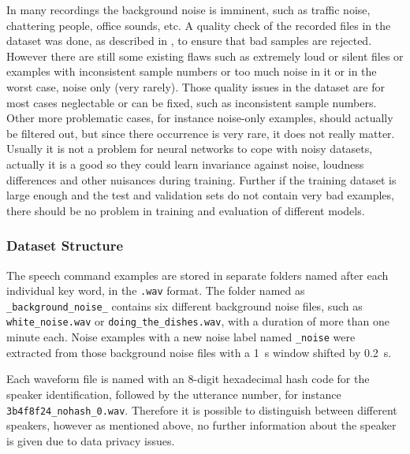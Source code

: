 In many recordings the background noise is imminent, such as traffic noise, chattering people, office sounds, etc.
A quality check of the recorded files in the dataset was done, as described in \cite{Warden2018}, to ensure that bad samples are rejected.
However there are still some existing flaws such as extremely loud or silent files or examples with inconsistent sample numbers or too much noise in it or in the worst case, noise only (very rarely).
Those quality issues in the dataset are for most cases neglectable or can be fixed, such as inconsistent sample numbers. 
Other more problematic cases, for instance noise-only examples, should actually be filtered out, but since there occurrence is very rare, it does not really matter.
Usually it is not a problem for neural networks to cope with noisy datasets, actually it is a good so they could learn invariance against noise, loudness differences and other nuisances during training.
Further if the training dataset is large enough and the test and validation sets do not contain very bad examples, there should be no problem in training and evaluation of different models.



\subsubsection{Dataset Structure}
The speech command examples are stored in separate folders named after each individual key word, in the \texttt{.wav} format.
The folder named as \texttt{\_background\_noise\_} contains six different background noise files, such as \texttt{white\_noise.wav} or \texttt{doing\_the\_dishes.wav}, with a duration of more than one minute each.
Noise examples with a new noise label named \texttt{\_noise} were extracted from those background noise files with a \SI{1}{\second} window shifted by \SI{0.2}{\second}.

Each waveform file is named with an 8-digit hexadecimal hash code for the speaker identification, followed by the utterance number, for instance \texttt{3b4f8f24\_nohash\_0.wav}.
Therefore it is possible to distinguish between different speakers, however as mentioned above, no further information about the speaker is given due to data privacy issues.

